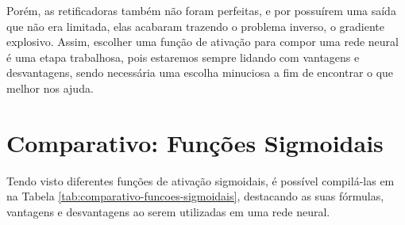 Porém, as retificadoras também não foram perfeitas, e por possuírem uma saída que não era limitada, elas acabaram trazendo o problema inverso, o gradiente explosivo. Assim, escolher uma função de ativação para compor uma rede neural é uma etapa trabalhosa, pois estaremos sempre lidando com vantagens e desvantagens, sendo necessária uma escolha minuciosa a fim de encontrar o que melhor nos ajuda.

\section{Comparativo: Funções Sigmoidais}

Tendo visto diferentes funções de ativação sigmoidais, é possível compilá-las em na Tabela \ref{tab:comparativo-funcoes-sigmoidais}, destacando as suas fórmulas, vantagens e desvantagens ao serem utilizadas em uma rede neural.

